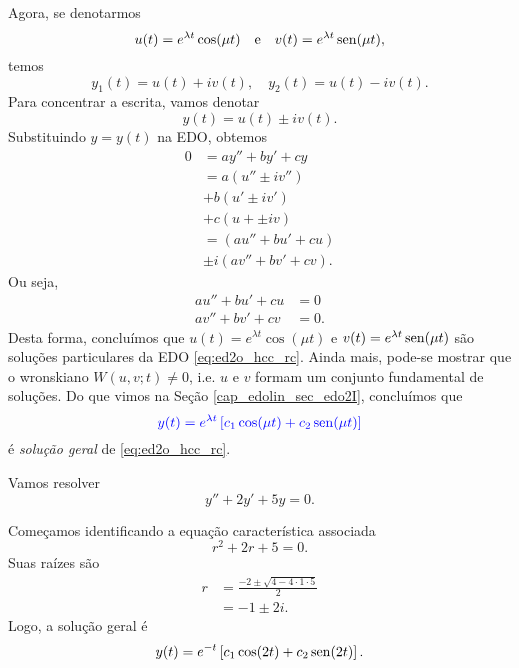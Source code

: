 Agora, se denotarmos
\begin{equation}
  u(t) = e^{\lambda t}\cos(\mu t)\quad\text{e}\quad v(t) = e^{\lambda t}\operatorname{sen}(\mu t),
\end{equation}
temos
\begin{equation}
  y_1(t) = u(t) + iv(t),\quad y_2(t) = u(t) - iv(t).
\end{equation}
Para concentrar a escrita, vamos denotar
\begin{equation}
  y(t) = u(t) \pm iv(t).
\end{equation}
Substituindo $y = y(t)$ na EDO, obtemos
\begin{align}
  0 &= ay'' + by' + cy \\
    &= a(u'' \pm iv'') \\
    &+ b(u' \pm iv') \\
    &+ c(u + \pm iv) \\
    &= (au'' + bu' + cu) \\
    &\pm i(av'' + bv' + cv).
\end{align}
Ou seja,
\begin{align}
  au'' + bu' + cu &= 0 \\
  av'' + bv' + cv &= 0.
\end{align}
Desta forma, concluímos que $u(t) = e^{\lambda t}\cos(\mu t)$ e $v(t) = e^{\lambda t}\operatorname{sen}(\mu t)$ são soluções particulares da EDO \eqref{eq:ed2o_hcc_rc}. Ainda mais, pode-se mostrar que o wronskiano $W(u,v;t)\neq 0$, i.e. $u$ e $v$ formam um conjunto fundamental de soluções. Do que vimos na Seção \ref{cap_edolin_sec_edo2I}, concluímos que
\begin{equation}
  {\color{blue}y(t) = e^{\lambda t}\left[c_1\cos(\mu t) + c_2\operatorname{sen}(\mu t)\right]}
\end{equation}
é \emph{solução geral} de \eqref{eq:ed2o_hcc_rc}.

\begin{ex}
  Vamos resolver
  \begin{equation}
    y'' + 2y' + 5y = 0.
  \end{equation}

  Começamos identificando a equação característica associada
  \begin{equation}
    r^2 + 2r + 5 = 0.
  \end{equation}
  Suas raízes são
  \begin{align}
    r &= \frac{-2 \pm \sqrt{4 - 4\cdot 1\cdot 5}}{2} \\
      &= -1 \pm 2i.
  \end{align}
  Logo, a solução geral é
  \begin{equation}
    y(t) = e^{-t}\left[c_1\cos(2t) + c_2\operatorname{sen}(2t)\right].
  \end{equation}
\end{ex}

